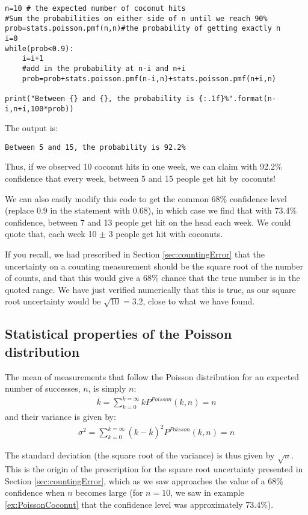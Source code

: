 \begin{example}{}
\begin{lstlisting}[frame=single]
n=10 # the expected number of coconut hits
#Sum the probabilities on either side of n until we reach 90%
prob=stats.poisson.pmf(n,n)#the probability of getting exactly n
i=0
while(prob<0.9):
    i=i+1
    #add in the probability at n-i and n+i
    prob=prob+stats.poisson.pmf(n-i,n)+stats.poisson.pmf(n+i,n)
    
print("Between {} and {}, the probability is {:.1f}%".format(n-i,n+i,100*prob))
\end{lstlisting}
The output is:
\begin{verbatim}
Between 5 and 15, the probability is 92.2%
\end{verbatim}
Thus, if we observed 10 coconut hits in one week, we can claim with 92.2\% confidence that every week, between 5 and 15 people get hit by coconuts! 

We can also easily modify this code to get the common 68\% confidence level (replace 0.9 in the  statement with 0.68), in which case we find that with 73.4\% confidence, between 7 and 13 people get hit on the head each week. We could quote that, each week 10 $\pm$ 3 people get hit with coconuts.

If you recall, we had prescribed in Section \ref{sec:countingError} that the uncertainty on a counting measurement should be the square root of the number of counts, and that this would give a 68\% chance that the true number is in the quoted range. We have just verified numerically that this is true, as our square root uncertainty would be $\sqrt{10}=3.2$, close to what we have found. 
\end{example}   

\subsection{Statistical properties of the Poisson distribution}
The mean of measurements that follow the Poisson distribution for an expected number of successes, $n$, is simply $n$:
\begin{align}
\bar k = \sum_{k=0}^{k=\infty}kP^{Poisson}(k,n)=n
\end{align}
and their variance is given by:
\begin{align}
\sigma^2 = \sum_{k=0}^{k=\infty}(k-\bar k)^2P^{Poisson}(k,n)=n
\end{align}

The standard deviation (the square root of the variance) is thus given by $\sqrt{n}$. This is the origin of the prescription for the square root uncertainty presented in Section \ref{sec:countingError}, which as we saw approaches the value of a 68\% confidence when $n$ becomes large (for $n=10$, we saw in example \ref{ex:PoissonCoconut} that the confidence level was approximately 73.4\%).

